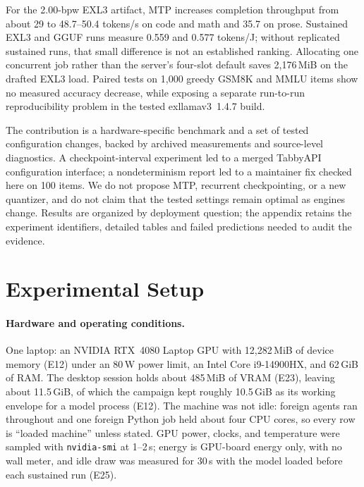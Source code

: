\documentclass[11pt]{article}
\newcommand{\q}[1]{\texttt{#1}}
\begin{document}
For the 2.00-bpw EXL3 artifact, MTP increases completion throughput from about 29 to
48.7--50.4 tokens/s on code and math and 35.7 on prose. Sustained EXL3 and
GGUF runs measure 0.559 and 0.577 tokens/J; without replicated sustained
runs, that small difference is not an established ranking. Allocating one
concurrent job rather than the server's four-slot default saves
2,176\,MiB on the drafted EXL3 load. Paired tests on 1,000 greedy GSM8K and
MMLU items show no measured accuracy decrease, while exposing a separate
run-to-run reproducibility problem in the tested exllamav3~1.4.7 build.

The contribution is a hardware-specific benchmark and a set of tested
configuration changes, backed by archived measurements and source-level
diagnostics. A checkpoint-interval experiment led to a merged TabbyAPI
configuration interface; a nondeterminism report led to a maintainer fix
checked here on 100 items. We do not propose MTP, recurrent checkpointing,
or a new quantizer, and do not claim that the tested settings remain optimal
as engines change. Results are organized by deployment question; the
appendix retains the experiment identifiers, detailed tables and failed
predictions needed to audit the evidence.

\section{Experimental Setup}
\label{sec:setup}

\paragraph{Hardware and operating conditions.}
One laptop: an NVIDIA RTX~4080 Laptop GPU with 12,282\,MiB of device memory
(E12) under an 80\,W power limit, an Intel Core i9-14900HX, and 62\,GiB of
RAM. The desktop session holds about 485\,MiB of VRAM (E23), leaving about
11.5\,GiB, of which the campaign kept roughly 10.5\,GiB as its working
envelope for a model process (E12). The machine was not idle: foreign agents ran
throughout and one foreign Python job held about four CPU cores, so every
row is ``loaded machine'' unless stated. GPU power, clocks, and temperature
were sampled with \q{nvidia-smi} at 1--2\,s; energy is GPU-board energy only,
with no wall meter, and idle draw was measured for 30\,s with the model
loaded before each sustained run (E25).
\end{document}

